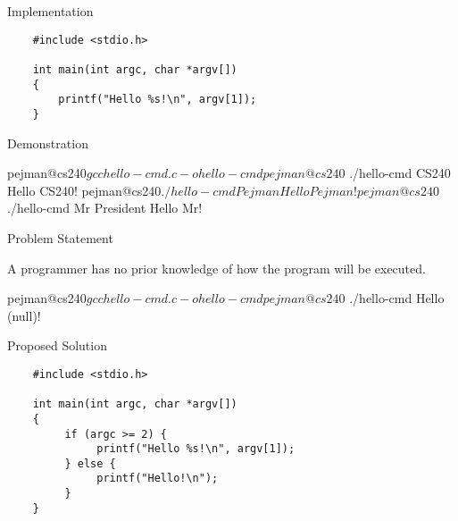 \documentclass[compress]{beamer}
\begin{document}
\begin{slide}
	\begin{block}{Implementation}

	\begin{verbatim}
	#include <stdio.h>

	int main(int argc, char *argv[])
	{
	    printf("Hello %s!\n", argv[1]);
	}
	\end{verbatim}

	\end{block}
\end{slide}

\begin{slide}
	\begin{block}{Demonstration}

	\begin{terminal}
	pejman@cs240$ gcc hello-cmd.c -o hello-cmd
	pejman@cs240$ ./hello-cmd CS240
	Hello CS240!
	pejman@cs240$ ./hello-cmd Pejman
	Hello Pejman!
	pejman@cs240$ ./hello-cmd Mr President
	Hello Mr!
	\end{terminal}

	\end{block}
\end{slide}

\begin{slide}
	\begin{block}{Problem Statement}

	A programmer has no prior knowledge of how the program will be executed.

	\begin{terminal}
	pejman@cs240$ gcc hello-cmd.c -o hello-cmd
	pejman@cs240$ ./hello-cmd
	Hello (null)!
	\end{terminal}

	\end{block}
\end{slide}

\begin{slide}
	\begin{block}{Proposed Solution}

	\begin{verbatim}
	#include <stdio.h>

	int main(int argc, char *argv[])
	{
	     if (argc >= 2) {
	          printf("Hello %s!\n", argv[1]);
	     } else {
	          printf("Hello!\n");
	     }
	}
	\end{verbatim}

	\end{block}
\end{slide}
\end{document}
